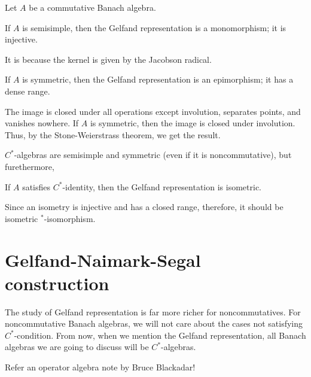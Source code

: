 \documentclass{../exp}
\begin{document}
Let $A$ be a commutative Banach algebra.
\begin{thm}
If $A$ is semisimple, then the Gelfand representation is a monomorphism; it is injective.
\end{thm}
\begin{pf}
It is because the kernel is given by the Jacobson radical.
\end{pf}
\begin{thm}
If $A$ is symmetric, then the Gelfand representation is an epimorphism; it has a dense range.
\end{thm}
\begin{pf}
The image is closed under all operations except involution, separates points, and vanishes nowhere.
If $A$ is symmetric, then the image is closed under involution.
Thus, by the Stone-Weierstrass theorem, we get the result.
\end{pf}
$C^*$-algebras are semisimple and symmetric (even if it is noncommutative), but furethermore,
\begin{thm}
If $A$ satisfies $C^*$-identity, then the Gelfand representation is isometric.
\end{thm}
Since an isometry is injective and has a closed range, therefore, it should be isometric $^*$-isomorphism.






\section{Gelfand-Naimark-Segal construction}

The study of Gelfand representation is far more richer for noncommutatives.
For noncommutative Banach algebras, we will not care about the cases not satisfying $C^*$-condition.
From now, when we mention the Gelfand representation, all Banach algebras we are going to discuss will be $C^*$-algebras.

Refer an operator algebra note by Bruce Blackadar!
\end{document}

